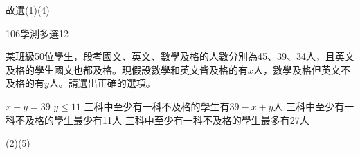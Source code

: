 \begin{QUESTIONS}
\begin{QUESTION}
\begin{QSOLLIST}
\begin{QSOL}
                故選(1)(4)
            \end{QSOL}
        \end{QSOLLIST}
        \begin{QEMPTYSPACE}
        \end{QEMPTYSPACE}
    \end{QUESTION}
    \begin{QUESTION}
        \begin{ExamInfo}{106}{學測}{多選}{12}
        \end{ExamInfo}
        \begin{ExamAnsRateInfo}{28}{37}{27}{20}
        \end{ExamAnsRateInfo}
        \begin{QBODY}
            某班級50位學生，段考國文、英文、數學及格的人數分別為45、39、34人，且英文及格的學生國文也都及格。現假設數學和英文皆及格的有$x$人，數學及格但英文不及格的有$y$人。請選出正確的選項。
			\begin{QOPS}
				\QOP $x+y=39$
				\QOP $y\le 11$
				\QOP 三科中至少有一科不及格的學生有$39-x+y$人
				\QOP 三科中至少有一科不及格的學生最少有11人
				\QOP 三科中至少有一科不及格的學生最多有27人
			\end{QOPS}
        \end{QBODY}
        \begin{QFROMS}
        \end{QFROMS}
        \begin{QTAGS}\end{QTAGS}
        \begin{QANS}
            (2)(5)
        \end{QANS}
        \begin{QSOLLIST}
            \begin{QSOL}
				\begin{QSTEPS}
\end{QSTEPS}
\end{QSOL}
\end{QSOLLIST}
\end{QUESTION}
\end{QUESTIONS}
